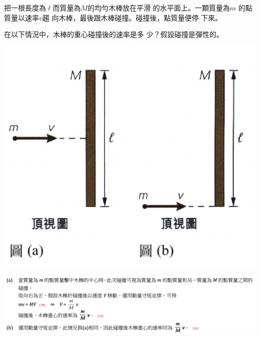 {
    把一根長度為$\ell$而質量為$M$的均勻木棒放在平滑 的水平面上。一顆質量為$m$ 的點質量以速率$v$趨 向木棒，最後跟木棒碰撞。碰撞後，點質量便停 下來。 \par 在以下情況中，木棒的重心碰撞後的速率是多 少？假設碰撞是彈性的。
    \par{\par\centering\includegraphics[width=.4\textwidth]{./img/ch5_momentum_lq_2024-05-11-21-10-19.png}\par}
    \clearpage{}
}{
    \sol
    \par{\par\centering\includegraphics[width=\textwidth]{./img/ch5_momentum_lq_2024-05-11-22-45-54.png}\par}
}
